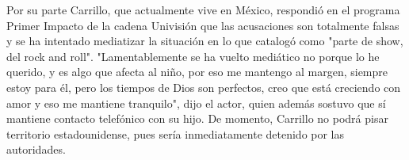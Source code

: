 \documentclass{article}%
\begin{document}
\newline%
%
Por su parte Carrillo, que actualmente vive en México, respondió en el programa Primer Impacto de la cadena Univisión que las acusaciones son totalmente falsas y se ha intentado mediatizar la situación en lo que catalogó como "parte de show, del rock and roll".%
\newline%
%
"Lamentablemente se ha vuelto mediático no porque lo he querido, y es algo que afecta al niño, por eso me mantengo al margen, siempre estoy para él, pero los tiempos de Dios son perfectos, creo que está creciendo con amor y eso me mantiene tranquilo", dijo el actor, quien además sostuvo que sí mantiene contacto telefónico con su hijo.%
\newline%
%
De momento, Carrillo no podrá pisar territorio estadounidense, pues sería inmediatamente detenido por las autoridades.%
\newline%
%
\end{document}
